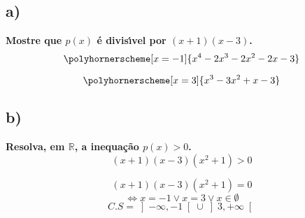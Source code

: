 \documentclass[a4paper]{article}
\begin{document}
\subsection*{a)}\textbf{Mostre que $p(x)$ é divisı́vel por $(x + 1)(x - 3)$.}
\[\polyhornerscheme[x=-1]{x^4-2x^3-2x^2-2x-3}\]

\[\polyhornerscheme[x=3]{x^3-3x^2+x-3}\]
\subsection*{b)}\textbf{Resolva, em $\mathbb{R}$, a inequação $p(x) > 0$.}
\[\text{$\left(x+1\right)\left(x-3\right)\left(x^2+1\right)>0$}\]

\[\text{$\left(x+1\right)\left(x-3\right)\left(x^2+1\right)=0$}\]
\[\Leftrightarrow x=-1 \lor x=3 \lor x \in \emptyset \]
\[C.S=\left]-\infty,-1\right[\cup \left]3,+\infty\right[\]
\end{document}
